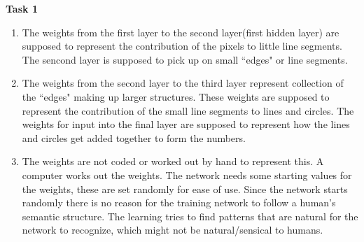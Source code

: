{\large \bf Task 1}
\begin{enumerate}
  \item The weights from the first layer to the second layer(first hidden layer) are supposed to represent the contribution of the pixels to little line segments.
        The sencond layer is supposed to pick up on small ``edges" or line segments.
  \item The weights from the second layer to the third layer represent collection of the ``edges" making up larger structures.
        These weights are supposed to represent the contribution of the small line segments to lines and circles.
        The weights for input into the final layer are supposed to represent how the lines and circles get added together to form the numbers.
  \item The weights are not coded or worked out by hand to represent this.
        A computer works out the weights.
        The network needs some starting values for the weights, these are set randomly for ease of use.
        Since the network starts randomly there is no reason for the training network to follow a human's semantic structure.
        The learning tries to find patterns that are natural for the network to recognize, which might not be natural/sensical to humans.
\end{enumerate}

